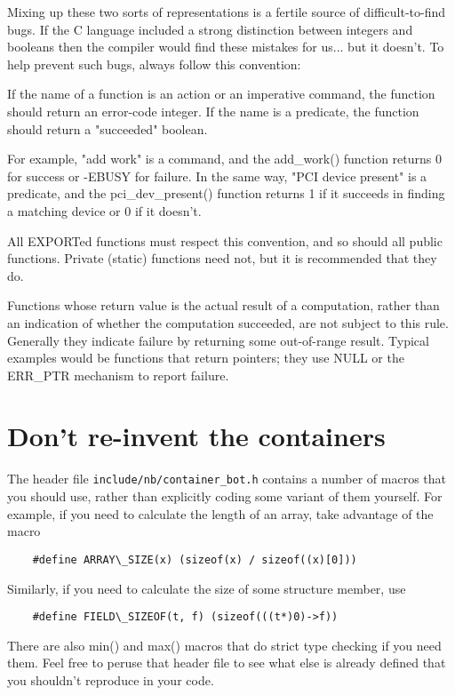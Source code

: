 \documentclass[pdftex,12pt, twocol]{article} %
\begin{document}
Mixing up these two sorts of representations is a fertile source of
difficult-to-find bugs.  If the C language included a strong distinction
between integers and booleans then the compiler would find these mistakes
for us... but it doesn't.  To help prevent such bugs, always follow this
convention:

	If the name of a function is an action or an imperative command,
	the function should return an error-code integer.  If the name
	is a predicate, the function should return a "succeeded" boolean.

For example, "add work" is a command, and the add\_work() function returns 0
for success or -EBUSY for failure.  In the same way, "PCI device present" is
a predicate, and the pci\_dev\_present() function returns 1 if it succeeds in
finding a matching device or 0 if it doesn't.

All EXPORTed functions must respect this convention, and so should all
public functions.  Private (static) functions need not, but it is
recommended that they do.

Functions whose return value is the actual result of a computation, rather
than an indication of whether the computation succeeded, are not subject to
this rule.  Generally they indicate failure by returning some out-of-range
result.  Typical examples would be functions that return pointers; they use
NULL or the ERR\_PTR mechanism to report failure.


\section{Don't re-invent the containers}

The header file \verb+include/nb/container_bot.h+ contains a number of macros that
you should use, rather than explicitly coding some variant of them yourself.
For example, if you need to calculate the length of an array, take advantage
of the macro

\begin{verbatim}
	#define ARRAY\_SIZE(x) (sizeof(x) / sizeof((x)[0]))
\end{verbatim}

Similarly, if you need to calculate the size of some structure member, use

\begin{verbatim}
	#define FIELD\_SIZEOF(t, f) (sizeof(((t*)0)->f))
\end{verbatim}

There are also min() and max() macros that do strict type checking if you
need them.  Feel free to peruse that header file to see what else is already
defined that you shouldn't reproduce in your code.
\end{document}
